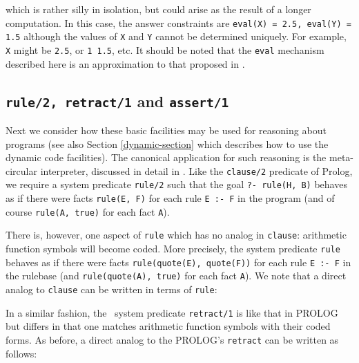 
\noindent
which is rather silly in isolation, but could arise as the result of a longer
computation. In this case, the answer constraints are 
{\tt eval(X) = 2.5, eval(Y) = 1.5} 
although the values of {\tt X} and {\tt Y} cannot be determined uniquely. 
For example, {\tt X} might be {\tt 2.5}, or {\tt 1 \unintt{+} 1.5}, etc.
It should be noted that the {\tt eval} mechanism described here is an 
approximation to that proposed in \cite{HEINTZE89}.

\subsection{{\tt rule/2, retract/1} and {\tt assert/1}}
\label{assert-section}

Next we consider how these basic facilities may be used for reasoning
about programs (see also Section \ref{dynamic-section} which describes
how to use the dynamic code facilities).  
The canonical application for such reasoning is
the meta-circular interpreter, discussed in detail in 
\cite{HEINTZE89}.
Like the {\tt clause/2} predicate of Prolog, 
we require a system predicate 
{\tt rule/2} such that the goal {\tt ?- rule(H, B)} behaves as if there 
were facts {\tt rule(E, F)} for each rule {\tt E :- F} in the program 
(and of course {\tt rule(A, true)} for each fact {\tt A}). 

There is, however, one aspect of {\tt rule} which has no analog in
{\tt clause}: arithmetic function symbols will become coded.
More precisely, the system predicate {\tt rule} 
behaves as if there were facts {\tt rule(quote(E), quote(F))}
for each rule {\tt E :- F} in the rulebase 
(and {\tt rule(quote(A), true)} for each fact {\tt A}).
We note that a direct analog to {\tt clause} can be written in terms of 
{\tt rule}: 


\noindent
In a similar fashion, the \CLPR\ system predicate {\tt retract/1}
is like that in PROLOG but differs in that one matches arithmetic
function symbols with their coded forms.
As before, a direct analog to the PROLOG's {\tt retract} can be written
as follows:

